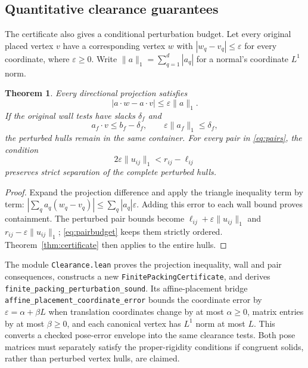 \documentclass[11pt,a4paper]{article}
\newcommand{\code}[1]{\texttt{\nolinkurl{#1}}}
\newtheorem{theorem}{Theorem}
\begin{document}
\subsection{Quantitative clearance guarantees}\label{sec:clearance}
The certificate also gives a conditional perturbation budget. Let every original
placed vertex $v$ have a corresponding vertex $w$ with
$|w_q-v_q|\leq\varepsilon$ for every coordinate, where $\varepsilon\geq0$.
Write $\|a\|_1=\sum_{q=1}^d|a_q|$ for a normal's coordinate $L^1$ norm.
\begin{theorem}\label{thm:clearance}
Every directional projection satisfies
\begin{equation}\label{eq:projectionbudget}
|a\cdot w-a\cdot v|\leq\varepsilon\|a\|_1.
\end{equation}
If the original wall tests have slacks $\delta_f$ and
\begin{equation}\label{eq:wallbudget}
a_f\cdot v\leq b_f-\delta_f,\qquad
\varepsilon\|a_f\|_1\leq\delta_f,
\end{equation}
the perturbed hulls remain in the same container. For every pair in
\eqref{eq:pairs}, the condition
\begin{equation}\label{eq:pairbudget}
2\varepsilon\|u_{ij}\|_1<r_{ij}-\ell_{ij}
\end{equation}
preserves strict separation of the complete perturbed hulls.
\end{theorem}
\begin{proof}
Expand the projection difference and apply the triangle inequality term by term:
$|\sum_q a_q(w_q-v_q)|\leq\sum_q|a_q|\varepsilon$.
Adding this error to each wall bound proves containment. The perturbed pair
bounds become $\ell_{ij}+\varepsilon\|u_{ij}\|_1$ and
$r_{ij}-\varepsilon\|u_{ij}\|_1$; \eqref{eq:pairbudget} keeps them strictly
ordered. Theorem~\ref{thm:certificate} then applies to the entire hulls.
\end{proof}

The module \code{Clearance.lean} proves the projection inequality, wall and
pair consequences, constructs a new \code{FinitePackingCertificate}, and
derives \code{finite_packing_perturbation_sound}. Its affine-placement bridge
\code{affine_placement_coordinate_error} bounds the coordinate error by
$\varepsilon=\alpha+\beta L$ when translation coordinates change by at most
$\alpha\geq0$, matrix entries by at most $\beta\geq0$, and each canonical
vertex has $L^1$ norm at most $L$. This converts a checked pose-error envelope
into the same clearance tests. Both pose matrices must separately satisfy the
proper-rigidity conditions if congruent solids, rather than perturbed vertex
hulls, are claimed.
\end{document}
